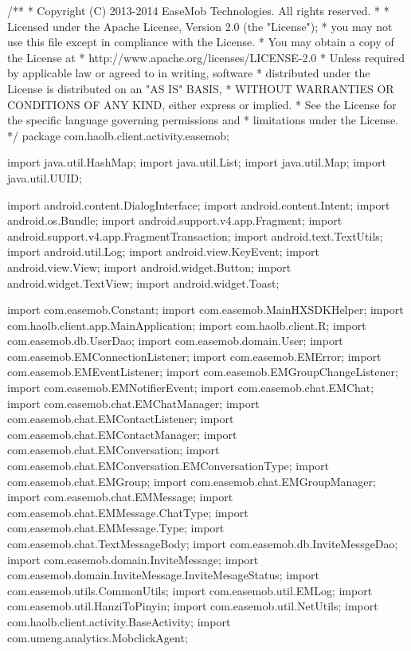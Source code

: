 /**
 * Copyright (C) 2013-2014 EaseMob Technologies. All rights reserved.
 *
 * Licensed under the Apache License, Version 2.0 (the "License");
 * you may not use this file except in compliance with the License.
 * You may obtain a copy of the License at
 *     http://www.apache.org/licenses/LICENSE-2.0
 * Unless required by applicable law or agreed to in writing, software
 * distributed under the License is distributed on an "AS IS" BASIS,
 * WITHOUT WARRANTIES OR CONDITIONS OF ANY KIND, either express or implied.
 * See the License for the specific language governing permissions and
 * limitations under the License.
 */
package com.haolb.client.activity.easemob;

import java.util.HashMap;
import java.util.List;
import java.util.Map;
import java.util.UUID;

import android.content.DialogInterface;
import android.content.Intent;
import android.os.Bundle;
import android.support.v4.app.Fragment;
import android.support.v4.app.FragmentTransaction;
import android.text.TextUtils;
import android.util.Log;
import android.view.KeyEvent;
import android.view.View;
import android.widget.Button;
import android.widget.TextView;
import android.widget.Toast;

import com.easemob.Constant;
import com.easemob.MainHXSDKHelper;
import com.haolb.client.app.MainApplication;
import com.haolb.client.R;
import com.easemob.db.UserDao;
import com.easemob.domain.User;
import com.easemob.EMConnectionListener;
import com.easemob.EMError;
import com.easemob.EMEventListener;
import com.easemob.EMGroupChangeListener;
import com.easemob.EMNotifierEvent;
import com.easemob.chat.EMChat;
import com.easemob.chat.EMChatManager;
import com.easemob.chat.EMContactListener;
import com.easemob.chat.EMContactManager;
import com.easemob.chat.EMConversation;
import com.easemob.chat.EMConversation.EMConversationType;
import com.easemob.chat.EMGroup;
import com.easemob.chat.EMGroupManager;
import com.easemob.chat.EMMessage;
import com.easemob.chat.EMMessage.ChatType;
import com.easemob.chat.EMMessage.Type;
import com.easemob.chat.TextMessageBody;
import com.easemob.db.InviteMessgeDao;
import com.easemob.domain.InviteMessage;
import com.easemob.domain.InviteMessage.InviteMesageStatus;
import com.easemob.utils.CommonUtils;
import com.easemob.util.EMLog;
import com.easemob.util.HanziToPinyin;
import com.easemob.util.NetUtils;
import com.haolb.client.activity.BaseActivity;
import com.umeng.analytics.MobclickAgent;

